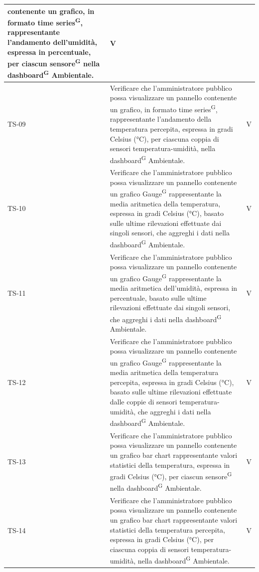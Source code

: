 \documentclass[8pt]{article}
\newcommand{\glossterm}[1]{#1\textsuperscript{G}} %
\begin{document}
\begin{longtable}{|>{\centering}p{2cm}|>{\RaggedRight}m{12cm}|>{\centering\arraybackslash}p{2cm}|}
    contenente un grafico, in formato \glossterm{time series}, rappresentante l'andamento dell'umidità, espressa
    in percentuale, per ciascun \glossterm{sensore} nella \glossterm{dashboard} Ambientale.
    & V \\
    \hline 
    TS-09 & Verificare che l'amministratore pubblico possa visualizzare un pannello
    contenente un grafico, in formato \glossterm{time series}, rappresentante l'andamento della temperatura
    percepita,
    espressa in gradi Celsius (°C), per ciascuna coppia di sensori temperatura-umidità, nella
    \glossterm{dashboard} Ambientale.
    & V \\
    \hline
    TS-10 & Verificare che l'amministratore pubblico possa visualizzare un pannello contenente
    un grafico \glossterm{Gauge} rappresentante la media aritmetica della temperatura,
    espressa in gradi Celsius (°C), basato sulle ultime rilevazioni effettuate dai singoli sensori, che aggreghi i dati nella \glossterm{dashboard} Ambientale.
    & V \\
    \hline
    TS-11 & Verificare che l'amministratore pubblico possa visualizzare un pannello contenente
    un grafico \glossterm{Gauge} rappresentante la media aritmetica dell'umidità,
    espressa in percentuale, basato sulle ultime rilevazioni effettuate dai singoli sensori, che aggreghi i dati nella \glossterm{dashboard} Ambientale.
    & V \\
    \hline
    TS-12 & Verificare che l'amministratore pubblico possa visualizzare un pannello contenente
    un grafico \glossterm{Gauge} rappresentante la media aritmetica della temperatura percepita,
    espressa in gradi Celsius (°C), basato sulle ultime rilevazioni effettuate dalle coppie di sensori temperatura-umidità, che aggreghi i dati nella \glossterm{dashboard} Ambientale.
    & V \\
    \hline
    TS-13 & Verificare che l'amministratore pubblico possa visualizzare un pannello contenente
    un grafico bar chart rappresentante valori statistici della temperatura,
    espressa in gradi Celsius (°C), per ciascun \glossterm{sensore} nella \glossterm{dashboard} Ambientale.
    & V \\
    \hline
    TS-14 & Verificare che l'amministratore pubblico possa visualizzare un pannello contenente
    un grafico bar chart rappresentante valori statistici della temperatura percepita,
    espressa in gradi Celsius (°C), per ciascuna coppia di sensori temperatura-umidità, nella \glossterm{dashboard} Ambientale.
    & V \\

\end{longtable}
\end{document}
